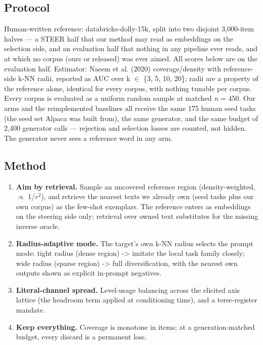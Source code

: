 \documentclass[11pt]{article}
\theoremstyle{plain}
\theoremstyle{definition}
\begin{document}
\subsection{Protocol}
Human-written reference: databricks-dolly-15k, split into two disjoint 3,000-item halves --- a STEER half that our method may read as embeddings on the selection side, and an evaluation half that nothing in any pipeline ever reads, and at which no corpus (ours or released) was ever aimed. All scores below are on the evaluation half. Estimator: Naeem et al. (2020) coverage/density with reference-side k-NN radii, reported as AUC over k $\in$ \{3, 5, 10, 20\}; radii are a property of the reference alone, identical for every corpus, with nothing tunable per corpus. Every corpus is evaluated as a uniform random sample at matched \emph{n} = 450. Our arms and the reimplemented baselines all receive the same 175 human seed tasks (the seed set Alpaca was built from), the same generator, and the same budget of 2,400 generator calls --- rejection and selection losses are counted, not hidden. The generator never sees a reference word in any arm.

\subsection{Method}
\begin{enumerate}
  \item \textbf{Aim by retrieval.} Sample an uncovered reference region (density-weighted, $\propto$ 1/$r^{2}$), and retrieve the nearest texts we already own (seed tasks plus our own corpus) as the few-shot exemplars. The reference enters as embeddings on the steering side only; retrieval over owned text substitutes for the missing inverse oracle.
  \item \textbf{Radius-adaptive mode.} The target's own k-NN radius selects the prompt mode: tight radius (dense region) -> imitate the local task family closely; wide radius (sparse region) -> full diversification, with the nearest own outputs shown as explicit in-prompt negatives.
  \item \textbf{Literal-channel spread.} Level-usage balancing across the elicited axis lattice (the headroom term applied at conditioning time), and a terse-register mandate.
  \item \textbf{Keep everything.} Coverage is monotone in items; at a generation-matched budget, every discard is a permanent loss.
\end{enumerate}
\end{document}
